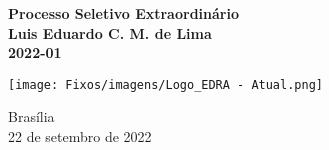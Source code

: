 


\usepackage{blindtext}


\begin{titlepage}
\begin{center}
\textbf{\Huge Processo Seletivo Extraordinário}\\ [0.8cm]
\textbf{\Large Luis Eduardo C. M. de Lima}\\[0.3cm]  %
\textbf{\Large 2022-01}\\
\end{center}



\vspace{200pt}
\texttt{[image: Fixos/imagens/Logo\_EDRA - Atual.png]}

\par
\vfill
\begin{center}
{{\normalsize Brasília}\\  %
{\normalsize 22 de setembro de 2022}}  %
\end{center}
\end{titlepage}

\newpage


\newpage
\renewcommand{\contentsname}{\centering Sumário}
\tableofcontents

\newpage

\newpage

\newpage


\newpage
%

\newpage

\newpage




